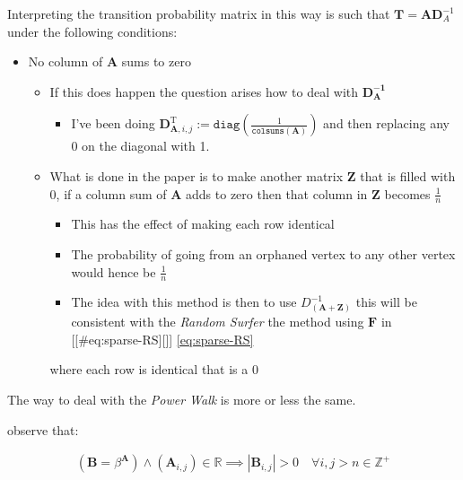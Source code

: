 \documentclass[11pt]{report}
\begin{document}
Interpreting the transition probability matrix in this way is such that
\(\mathbf{T}= \mathbf{A}\mathbf{D}^{- 1}_A\) under the following
conditions:


\begin{itemize}
\item No column of \(\mathbf{A}\) sums to zero

\begin{itemize}
\item If this does happen the question arises how to deal with
\(\mathbf{D_\mathbf{A}^{- 1}}\)

\begin{itemize}
\item I've been doing \(\mathbf{D}^{\mathrm{T}}_{\mathbf{A}, i, j} := \mathtt{diag} \left( {\frac{1}{\mathtt{colsums}\left( \mathbf{A} \right)}} \right)\)
and then replacing any \(0\) on the diagonal with 1.
\end{itemize}

\item What is done in the paper is to make another matrix \(\mathbf{Z}\)
that is filled with 0, if a column sum of \(\mathbf{A}\) adds to zero
then that column in \(\mathbf{Z}\) becomes \(\frac{1}{n}\)

\begin{itemize}
\item This has the effect of making each row identical

\item The probability of going from an orphaned vertex to any other
vertex would hence be \(\frac{1}{n}\)

\item The idea with this method is then to use
\(D_\mathbf{\left( A+Z \right)}^{- 1}\) this will be consistent with
the \emph{Random Surfer} the method using \(\mathbf{F}\) in
[[\#eq:sparse-RS][]] \eqref{eq:sparse-RS}
\end{itemize}

where each row is identical that is a 0
\end{itemize}
\end{itemize}

The way to deal with the \emph{Power Walk} is more or less the same.

observe that:

\begin{align}
   \left( \mathbf{B} = \beta^{\mathbf{A}} \right)\wedge \left( \mathbf{A}_{i, j}\right)\in \mathbb{R}  \implies  \left\lvert \mathbf{B}_{i, j} \right\rvert > 0 \quad \forall i,j>n\in \mathbb{Z}^+ \label{eq:b-is-pos}
\end{align}
\end{document}
